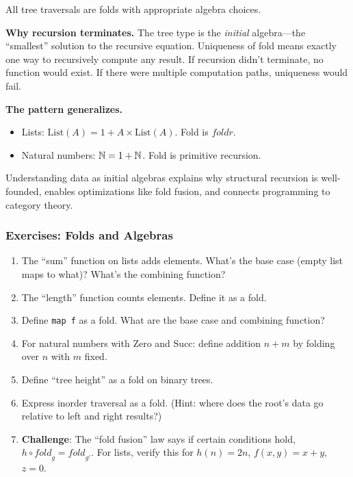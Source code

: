\begin{goingdeeper}
All tree traversals are folds with appropriate algebra choices.

\textbf{Why recursion terminates.} The tree type is the \emph{initial} algebra---the ``smallest'' solution to the recursive equation. Uniqueness of fold means exactly one way to recursively compute any result. If recursion didn't terminate, no function would exist. If there were multiple computation paths, uniqueness would fail.

\textbf{The pattern generalizes.}
\begin{itemize}
  \item Lists: $\text{List}(A) = 1 + A \times \text{List}(A)$. Fold is $\textit{foldr}$.
  \item Natural numbers: $\mathbb{N} = 1 + \mathbb{N}$. Fold is primitive recursion.
\end{itemize}

Understanding data as initial algebras explains why structural recursion is well-founded, enables optimizations like fold fusion, and connects programming to category theory.

\subsubsection*{Exercises: Folds and Algebras}

\begin{enumerate}
  \item The ``sum'' function on lists adds elements. What's the base case (empty list maps to what)? What's the combining function?

  \item The ``length'' function counts elements. Define it as a fold.

  \item Define \texttt{map f} as a fold. What are the base case and combining function?

  \item For natural numbers with $\text{Zero}$ and $\text{Succ}$: define addition $n + m$ by folding over $n$ with $m$ fixed.

  \item Define ``tree height'' as a fold on binary trees.

  \item Express inorder traversal as a fold. (Hint: where does the root's data go relative to left and right results?)

  \item \textbf{Challenge}: The ``fold fusion'' law says if certain conditions hold, $h \circ \textit{fold}_g = \textit{fold}_{g'}$. For lists, verify this for $h(n) = 2n$, $f(x, y) = x + y$, $z = 0$.
\end{enumerate}
\end{goingdeeper}

